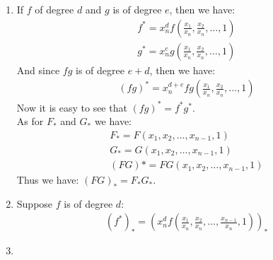 \begin{enumerate}[label=\ilabel]
    \item 
        If $f$ of degree $d$ and $g$ is of degree $e$, then we have:
        \begin{gather*}
            f^* = x_n^d f(\frac{x_1}{x_n}, \frac{x_2}{x_n}, \dots, 1) \\
            g^* = x_n^e g(\frac{x_1}{x_n}, \frac{x_2}{x_n}, \dots, 1)
        \end{gather*}
        And since $fg$ is of degree $e + d$, then we have:
        \begin{gather*}
            (fg)^* = x_n^{d + e} fg(\frac{x_1}{x_n}, \frac{x_2}{x_n}, \dots, 1)
        \end{gather*}
        Now it is easy to see that $(fg)^* = f^* g^*$. \\
        As for $F_*$ and $G_*$ we have:
        \begin{gather*}
            F_* = F(x_1, x_2, \dots, x_{n - 1}, 1) \\
            G_* = G(x_1, x_2, \dots, x_{n - 1}, 1) \\
            (FG)* = FG(x_1, x_2, \dots, x_{n - 1}, 1)
        \end{gather*}
        Thus we have: $(FG)_* = F_* G_*$. 
    \item 
        Suppose $f$ is of degree $d$:
        \begin{gather*}
            (f^*)_* = (x_n^d f(\frac{x_1}{x_n}, \frac{x_2}{x_n}, \dots, \frac{x_{n - 1}}{x_n}, 1))_*
        \end{gather*}
    \item 
\end{enumerate}